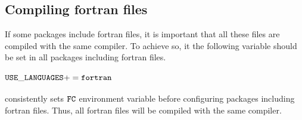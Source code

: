 \subsection*{Compiling fortran files}

If some packages include fortran files, it is important that all these files are compiled with the same compiler. To achieve so, it the following variable should be set in all packages including fortran files.

\paragraph{${\tt USE\_LANGUAGES+=fortran}$} consistently sets ${\tt FC}$ environment variable before configuring packages including fortran files. Thus, all fortran files will be compiled with the same compiler.
